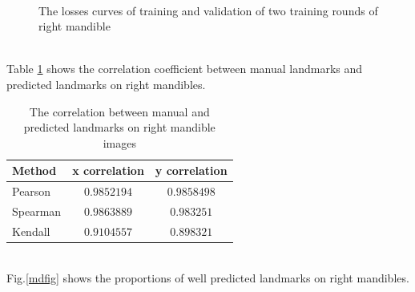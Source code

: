 \documentclass[12pt,a4paper]{article}
\begin{document}
\begin{figure}[h!]
\centering
{}~~
\caption{The losses curves of training and validation of two training rounds of right mandible  }
\label{lossmdcurves}
\end{figure}~\\
Table \ref{corrmd} shows the correlation coefficient between manual landmarks and predicted landmarks on right mandibles.\\[0.1cm]
\begin{table}[h!]
	\centering
	\begin{tabular}{l c c}
		Method & x correlation & y correlation \\ \hline
		Pearson & $0.9852194$ & $0.9858498$ \\ \hline
		Spearman & $0.9863889$ & $0.983251$ \\ \hline
		Kendall & $0.9104557$ & $0.898321$ \\ \hline
	\end{tabular}
	\caption{The correlation between manual and predicted landmarks on right mandible images}
	\label{corrmd}
\end{table}~\\
Fig.\ref{mdfig} shows the proportions of well predicted landmarks on right mandibles.
\end{document}
